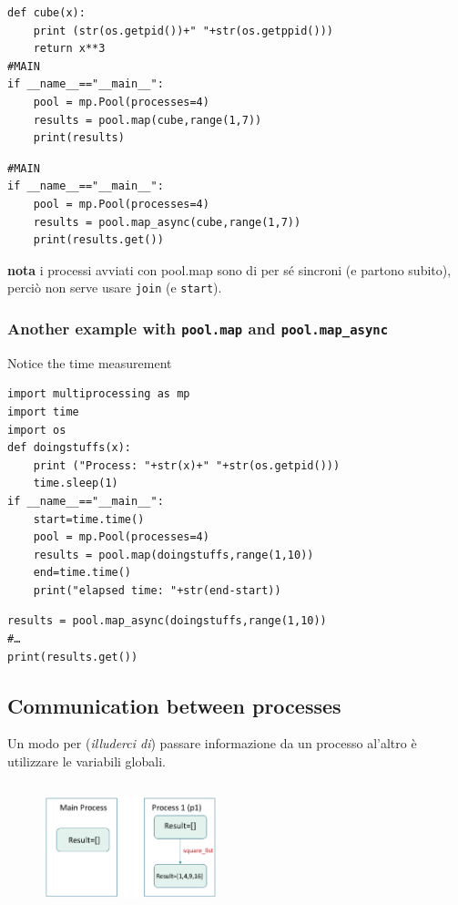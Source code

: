 \begin{verbatim}
def cube(x):
    print (str(os.getpid())+" "+str(os.getppid()))
    return x**3
#MAIN
if __name__=="__main__":
    pool = mp.Pool(processes=4)
    results = pool.map(cube,range(1,7))
    print(results)
\end{verbatim}

\begin{verbatim}
#MAIN
if __name__=="__main__":
    pool = mp.Pool(processes=4)
    results = pool.map_async(cube,range(1,7))
    print(results.get())
\end{verbatim}

\textbf{nota} i processi avviati con pool.map sono di per sé sincroni (e partono subito), perciò non serve usare \texttt{join} (e \texttt{start}).\\

\subsubsection{Another example with \texttt{pool.map} and \texttt{pool.map\_async}}
Notice the time
measurement

\begin{verbatim}
import multiprocessing as mp
import time
import os
def doingstuffs(x):
    print ("Process: "+str(x)+" "+str(os.getpid()))
    time.sleep(1)
if __name__=="__main__":
    start=time.time()
    pool = mp.Pool(processes=4)
    results = pool.map(doingstuffs,range(1,10))
    end=time.time()
    print("elapsed time: "+str(end-start))
\end{verbatim}

\begin{verbatim}
results = pool.map_async(doingstuffs,range(1,10))
#…
print(results.get())
\end{verbatim}


\subsection{Communication between processes}

Un modo per (\textit{illuderci di}) passare informazione da un processo al'altro è utilizzare le variabili globali.

\inputminted{python}{python_parallel/communication1.py}



\begin{figure}[ht]
    \centering
    \includegraphics[width=0.45\textwidth]{figure_parallel/communication_global.png}\end{figure}
\FloatBarrier

